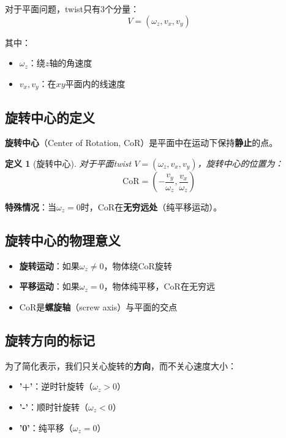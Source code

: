 \documentclass[12pt,a4paper]{article}
\newtheorem{definition}{定义}
\begin{document}
对于平面问题，twist只有3个分量：
\begin{equation}
V = (\omega_z, v_x, v_y)
\label{eq:planar_twist}
\end{equation}

其中：
\begin{itemize}
\item $\omega_z$：绕$z$轴的角速度
\item $v_x, v_y$：在$xy$平面内的线速度
\end{itemize}

\subsection{旋转中心的定义}

\textbf{旋转中心}（Center of Rotation, CoR）是平面中在运动下保持\textbf{静止}的点。

\begin{definition}[旋转中心]
对于平面twist $V = (\omega_z, v_x, v_y)$，旋转中心的位置为：
\begin{equation}
\text{CoR} = \left(-\frac{v_y}{\omega_z}, \frac{v_x}{\omega_z}\right)
\label{eq:cor_position}
\end{equation}
\end{definition}

\textbf{特殊情况}：当$\omega_z = 0$时，CoR在\textbf{无穷远处}（纯平移运动）。

\subsection{旋转中心的物理意义}

\begin{itemize}
\item \textbf{旋转运动}：如果$\omega_z \neq 0$，物体绕CoR旋转
\item \textbf{平移运动}：如果$\omega_z = 0$，物体纯平移，CoR在无穷远
\item CoR是\textbf{螺旋轴}（screw axis）与平面的交点
\end{itemize}

\subsection{旋转方向的标记}

为了简化表示，我们只关心旋转的\textbf{方向}，而不关心速度大小：

\begin{itemize}
\item \textbf{'+'}：逆时针旋转（$\omega_z > 0$）
\item \textbf{'-'}：顺时针旋转（$\omega_z < 0$）
\item \textbf{'0'}：纯平移（$\omega_z = 0$）
\end{itemize}
\end{document}
